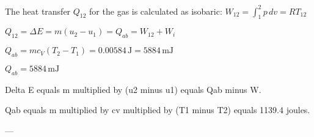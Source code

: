 The heat transfer \( Q_{12} \) for the gas is calculated as isobaric:  
\( W_{12} = \int_1^2 p \, dv = R T_{12} \)  

\( Q_{12} = \Delta E = m (u_2 - u_1) = Q_{ab} = W_{12} + W_{i} \)  

\( Q_{ab} = m c_V (T_2 - T_1) = 0.00584 \, \text{J} = 5884 \, \text{mJ} \)  

\( Q_{ab} = 5884 \, \text{mJ} \)

Delta E equals m multiplied by (u2 minus u1) equals Qab minus W.  

Qab equals m multiplied by cv multiplied by (T1 minus T2) equals 1139.4 joules.  

---